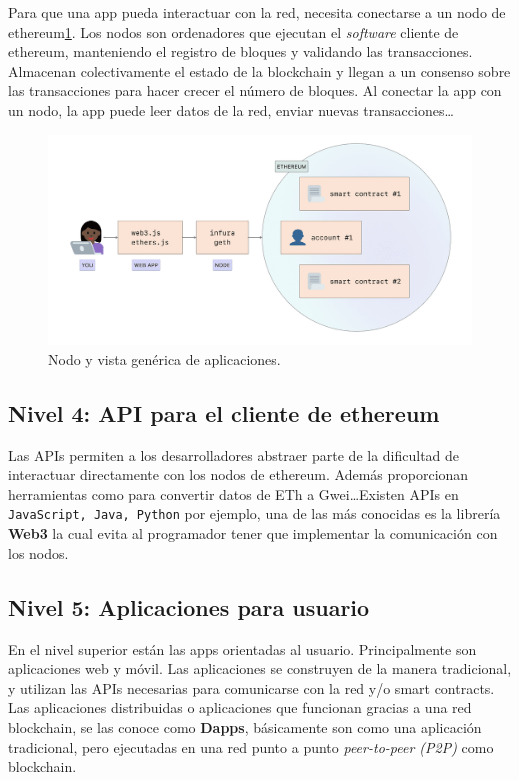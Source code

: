 Para que una app pueda interactuar con la red, necesita conectarse a un nodo de ethereum\ref{fig:etherNodo}. Los nodos son ordenadores que ejecutan el \emph{software} cliente de ethereum, manteniendo el registro de bloques y validando las transacciones. Almacenan colectivamente el estado de la blockchain y llegan a un consenso sobre las transacciones para hacer crecer el número de bloques. Al conectar la app con un nodo, la app puede leer datos de la red, enviar nuevas transacciones\dots

\begin{figure}[h!]
  \centering
  \includegraphics[width=0.8\linewidth]{figs/EstadoArte/Ethereum/ethereumNodo}
  \caption[Nodos vista genérica]{Nodo y vista genérica de aplicaciones.}
  \label{fig:etherNodo}
\end{figure}

\subsection{Nivel 4: API para el cliente de ethereum}

Las APIs permiten a los desarrolladores abstraer parte de la dificultad de interactuar directamente con los nodos de ethereum. Además proporcionan herramientas como para convertir datos de ETh a Gwei\dots Existen APIs en \verb|JavaScript, Java, Python| por ejemplo, una de las más conocidas es la librería \textbf{Web3}\cite{web3} la cual evita al programador tener que implementar la comunicación con los nodos. 

\subsection{Nivel 5: Aplicaciones para usuario}

En el nivel superior están las apps orientadas al usuario. Principalmente son aplicaciones web y móvil. Las aplicaciones se construyen de la manera tradicional, y utilizan las APIs necesarias para comunicarse con la red y/o smart contracts. Las aplicaciones distribuidas o aplicaciones que funcionan gracias a una red blockchain, se las conoce como \textbf{Dapps}, básicamente son como una aplicación tradicional, pero ejecutadas en una red punto a punto \textit{peer-to-peer (P2P)} como blockchain.

